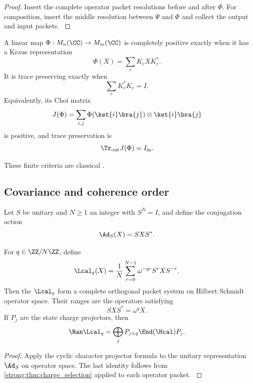 \begin{proof}\label{strong:proof:032}
Insert the complete operator packet resolutions before and after \(\Phi\). For composition, insert the middle resolution between \(\Psi\) and \(\Phi\) and collect the output and input packets.
\label{strong:proof:032:end}\end{proof}

\begin{standardfact}\label{strong:standardfact:001}\label{strong:fact:kraus_choi}
A linear map \(\Phi:M_n(\CC)\to M_m(\CC)\) is completely positive exactly when it has a Kraus representation
\[
\Phi(X)=\sum_rK_rXK_r^*.
\]
It is trace preserving exactly when
\[
\sum_rK_r^*K_r=I.
\]
Equivalently, its Choi matrix
\[
J(\Phi)
=
\sum_{i,j}\Phi(\ket{i}\bra{j})\otimes\ket{i}\bra{j}
\]
is positive, and trace preservation is
\[
\Tr_{\rm out}J(\Phi)=I_{\rm in}.
\]
\end{standardfact}

These finite criteria are classical \cite{Stinespring1955,Choi1975,Kraus1983,Watrous2018}.

\subsection{Covariance and coherence order}\label{strong:subsec:channel_covariance}

Let \(S\) be unitary and \(N\ge1\) an integer with \(S^N=I\), and define the conjugation action
\[
\Ad_S(X)=SXS^*.
\]

\begin{theorem}\label{strong:theorem:022}\label{strong:thm:coherence_projectors}
For \(q\in\ZZ/N\ZZ\), define
\[
\Lcal_q(X)
=
\frac1N
\sum_{r=0}^{N-1}
\omega^{-qr}S^rXS^{-r}.
\]
Then the \(\Lcal_q\) form a complete orthogonal packet system on Hilbert Schmidt operator space. Their ranges are the operators satisfying
\[
SXS^*=\omega^qX.
\]
If \(P_j\) are the state charge projectors, then
\[
\Ran\Lcal_q
=
\bigoplus_jP_{j+q}\End(\Hcal)P_j.
\]
\end{theorem}

\begin{proof}\label{strong:proof:033}
Apply the cyclic character projector formula to the unitary representation \(\Ad_S\) on operator space. The last identity follows from \cref{strong:thm:charge_selection} applied to each operator packet.
\label{strong:proof:033:end}\end{proof}

